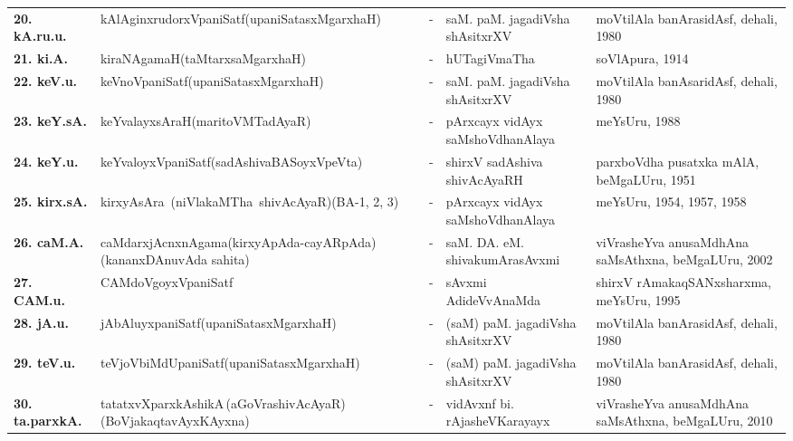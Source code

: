 {\begin{longtable}{@{}lp{5cm}cp{5cm}<{\raggedright}p{3cm}<{\raggedright}@{}}
{\bf 20. kA.ru.u.} & kAlAginxrudorxVpaniSatf\newline (upaniSatasxMgarxhaH) &-& saM. paM. jagadiVsha shAsitxrXV & moVtilAla banArasidAsf, dehali, 1980\\
{\bf 21. ki.A.} & kiraNAgamaH\newline (taMtarxsaMgarxhaH) &-& hUTagiVmaTha & soVlApura, 1914\\
{\bf 22. keV.u.} & keVnoVpaniSatf\newline (upaniSatasxMgarxhaH) &-& saM. paM. jagadiVsha shAsitxrXV & moVtilAla banAsaridAsf, dehali, 1980\\
{\bf 23. keY.sA.} & keYvalayxsAraH\newline (maritoVMTadAyaR) &-& pArxcayx vidAyx saMshoVdhanAlaya & meYsUru, 1988\\
{\bf 24. keY.u.} & keYvaloyxVpaniSatf\newline (sadAshivaBASoyxVpeVta) &-& shirxV sadAshiva shivAcAyaRH & parxboVdha pusatxka mAlA, beMgaLUru, 1951\\
{\bf 25. kirx.sA.} & \hbox{kirxyAsAra (niVlakaMTha shivAcAyaR)}\newline (BA-1, 2, 3) &-& pArxcayx vidAyx saMshoVdhanAlaya & meYsUru, 1954, 1957, 1958\\
{\bf 26. caM.A.} & caMdarxjAcnxnAgama\newline (kirxyApAda-cayARpAda)\newline (kananxDAnuvAda sahita) &-& saM. DA. eM. shivakumArasAvxmi & viVrasheYva anusaMdhAna saMsAthxna, beMgaLUru, 2002\\
{\bf 27. CAM.u.} & CAMdoVgoyxVpaniSatf &-& sAvxmi AdideVvAnaMda & shirxV rAmakaqSANxsharxma, meYsUru, 1995\\
{\bf 28. jA.u.} & jAbAluyxpaniSatf\newline (upaniSatasxMgarxhaH) &-& (saM) paM. jagadiVsha shAsitxrXV & moVtilAla banArasidAsf, dehali, 1980\\
{\bf 29. teV.u.} & teVjoVbiMdUpaniSatf\newline (upaniSatasxMgarxhaH) &-& (saM) paM. jagadiVsha shAsitxrXV & moVtilAla banArasidAsf, dehali, 1980\\
{\bf 30. ta.parxkA.} & tatatxvXparxkAshikA\,(aGoVrashivAcAyaR)\newline (BoVjakaqtavAyxKAyxna) &-& vidAvxnf bi. rAjasheVKarayayx & viVrasheYva anusaMdhAna saMsAthxna, beMgaLUru, 2010\\

\end{longtable}}
